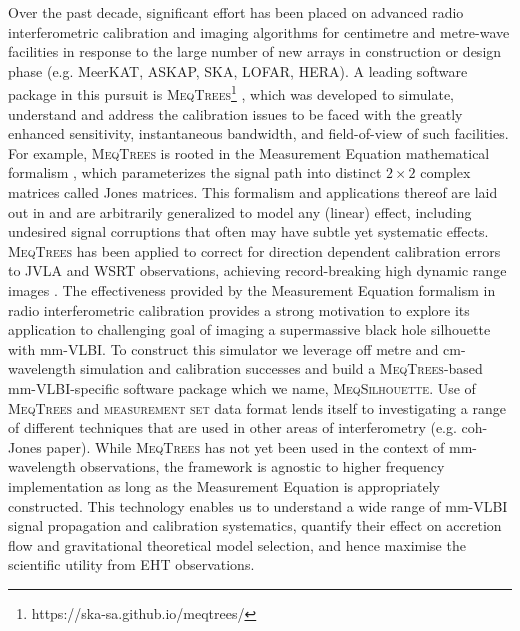 Over the past decade, significant effort has been placed on advanced radio interferometric calibration and imaging algorithms for centimetre and metre-wave facilities in response to the large number of new arrays in construction or design phase (e.g. MeerKAT, ASKAP, SKA, LOFAR, HERA). A leading software package in this pursuit is \textsc{MeqTrees}\footnote{https://ska-sa.github.io/meqtrees/} \citep*{Noordam_2010}, which was developed to simulate, understand and address the calibration issues to be faced with the greatly enhanced sensitivity, instantaneous bandwidth, and field-of-view of such facilities. For example, \textsc{MeqTrees} is rooted in the Measurement Equation mathematical formalism \citep{Hamaker_1996}, which parameterizes the signal path into distinct $2 \times 2$ complex  matrices called Jones matrices. This formalism and applications thereof are laid out in \citep{Smirnov_2011a,Smirnov_2011b,Smirnov_2011c} and are arbitrarily generalized to model any (linear) effect, including undesired signal corruptions that often may have subtle yet systematic effects. \textsc{MeqTrees} has been applied to correct for direction dependent calibration errors to JVLA and WSRT observations, achieving record-breaking high dynamic range images \citep{Smirnov_2011c}. The effectiveness provided by the Measurement Equation formalism in radio interferometric calibration provides a strong motivation to explore its application to challenging goal of imaging a supermassive black hole silhouette with mm-VLBI. To construct this simulator we leverage off metre and cm-wavelength simulation and calibration successes and build a \textsc{MeqTrees}-based mm-VLBI-specific software package which we name, \textsc{MeqSilhouette}.  Use of \textsc{MeqTrees} and \textsc{measurement set} data format lends itself to investigating a range of different techniques that are used in other areas of interferometry (e.g. coh-Jones paper). While \textsc{MeqTrees} has not yet been used in the context of mm-wavelength observations, the framework is agnostic to higher frequency implementation as long as the Measurement Equation is appropriately constructed. This technology enables us to understand a wide range of mm-VLBI signal propagation and calibration systematics, quantify their effect on accretion flow and gravitational theoretical model selection, and hence maximise the scientific utility from EHT observations. 






















